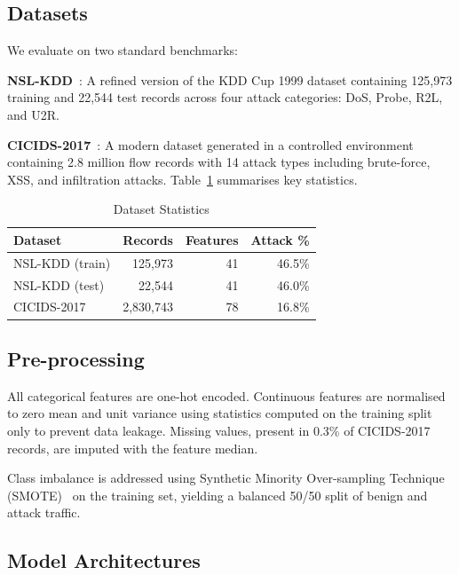 \documentclass[conference]{IEEEtran}
\begin{document}
\subsection{Datasets}

We evaluate on two standard benchmarks:

\textbf{NSL-KDD}~\cite{ref:tavallaee2009}: A refined version of the
KDD Cup 1999 dataset containing 125,973 training and 22,544 test
records across four attack categories: DoS, Probe, R2L, and U2R.

\textbf{CICIDS-2017}~\cite{ref:sharafaldin2018}: A modern dataset
generated in a controlled environment containing 2.8 million flow
records with 14 attack types including brute-force, XSS, and
infiltration attacks. Table~\ref{tab:datasets} summarises key
statistics.

\begin{table}[h]
	\caption{Dataset Statistics}
	\label{tab:datasets}
	\centering
	\begin{tabular}{@{} l r r r @{}}
		\toprule
		\textbf{Dataset} & \textbf{Records}   & \textbf{Features}
		                 & \textbf{Attack \%}                              \\
		\midrule
		NSL-KDD (train)  & 125,973            & 41                & 46.5\% \\
		NSL-KDD (test)   & 22,544             & 41                & 46.0\% \\
		CICIDS-2017      & 2,830,743          & 78                & 16.8\% \\
		\bottomrule
	\end{tabular}
\end{table}

\subsection{Pre-processing}

All categorical features are one-hot encoded. Continuous features
are normalised to zero mean and unit variance using statistics
computed on the training split only to prevent data leakage.
Missing values, present in 0.3\% of CICIDS-2017 records, are imputed
with the feature median.

Class imbalance is addressed using Synthetic Minority Over-sampling
Technique (SMOTE)~\cite{ref:chawla2002} on the training set, yielding
a balanced 50/50 split of benign and attack traffic.

\subsection{Model Architectures}
\end{document}
